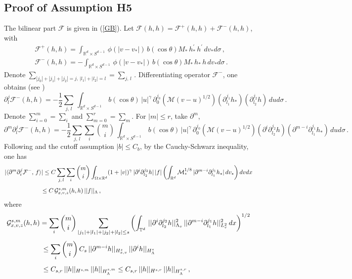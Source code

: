 \documentclass[final,onefignum,onetabnum]{siamart171218}
\begin{document}
\subsection{Proof of Assumption H5}
\label{Proof_H4}
The bilinear part $\mathcal F$ is given in (\ref{GB}). Let $\mathcal F(h,h)=\mathcal F^{+}(h,h) + \mathcal F^{-}(h,h)$, with
\begin{align*}
&\displaystyle \mathcal F^{+}(h,h)= \int_{\mathbb R^{d}\times S^{d-1}}\, \phi(|v-v_{\ast}|)\, b(\cos\theta)
M_{\ast}\, h_{\ast}^{\prime}\, h^{\prime}\, dv_{\ast}d\sigma\,,  \\[2pt]
&\displaystyle \mathcal F^{-}(h,h) = -\int_{\mathbb R^{d}\times S^{d-1}}\,  \phi(|v-v_{\ast}|)\, b(\cos\theta)
M_{\ast}\, h_{\ast}\, h\, dv_{\ast}d\sigma\,.
\end{align*}
Denote $\sum_{|j_0|+|j_1|+|j_2|=j,\, |l_1|+|l_2|=l} =\sum_{j,\, l}$\,. 
Differentiating operator $\mathcal F^{-}$, one obtains (see \cite{MB})
$$\partial_l^{j}\mathcal F^{-}(h,h)=-\frac{1}{2}\sum_{j,\, l}\, \int_{\mathbb R^{d}\times S^{d-1}}\,
b(\cos\theta)\, |u|^{\gamma}\, \partial_{0}^{j_0}\left(\mathcal M(v-u)^{1/2}\right)(\partial_{l_1}^{j_1}h_{\ast})(\partial_{l_2}^{j_2}h)\, dud\sigma\,.$$
Denote $\sum_{i=0}^{m}=\sum_{i}$ and $\sum_{m=0}^{r}=\sum_{m}$.
For $|m|\leq r$, take $\partial^m$,
$$ \partial^m \partial_l^{j}\mathcal F^{-}(h,h) = -\frac{1}{2}\sum_{j,\, l}\sum_{i}\binom{m}{i}\,
\int_{\mathbb R^{d}\times S^{d-1}}\, b(\cos\theta)\, |u|^{\gamma}\, \partial_{0}^{j_0}\left(\mathcal M(v-u)^{1/2}\right)
(\partial^{i}\partial_{l_2}^{j_2}h)(\partial^{m-i}\partial_{l_1}^{j_1}h_{\ast})\, dud\sigma\,. $$
Following \cite{MB} and the cutoff assumption $|b|\leq C_b$, by the Cauchy-Schwarz inequality, one has
\begin{align}
&\displaystyle |\langle\partial^{m}\partial_i^{j}\mathcal F^{-}, \, f\rangle| \leq C \sum_{j,\, l} \sum_{i}\binom{m}{i}
\int_{\Omega\times\mathbb R^{d}} (1+|v|)^{\gamma}\, |\partial^{i}\partial_{l_2}^{j_2}h|\, |f| \left(\int_{\mathbb R^{d}}\mathcal
M_{\ast}^{1/8}\, |\partial^{m-i}\partial_{l_1}^{j_1}h_{\ast}|\, dv_{\ast}\right) dvdx \notag\\[4pt]
&\label{G0}\displaystyle \qquad\qquad\qquad\leq C\, \mathcal G^{s,m}_{x,v,z}(h,h)\, ||f||_{\Lambda}\,,
\end{align}
where
\begin{align}
&\displaystyle\mathcal G^{s,m}_{x,v,z}(h,h) = \sum_{i}\binom{m}{i} \sum_{|j_1|+|l_1|+|j_2|+|l_2|\leq s}\left(\int_{\mathbb T^{d}}\, ||\partial^{i}\partial_{l_2}^{j_2}h||_{\Lambda_v}^2\, ||\partial^{m-i}\partial_{l_1}^{j_1}h||_{L^2_v}^2\, dx\right)^{1/2} \notag\\[4pt]
&\displaystyle\qquad\qquad\quad\leq \sum_{i}\binom{m}{i}\,
C_s\, ||\partial^{m-i}h||_{H_{x,v}^s}\, ||\partial^i h||_{H_{\Lambda}^s}
\notag \\[4pt]
&\label{G1}\displaystyle\qquad\qquad\quad\leq C_{s,r}\, ||h||_{H^{s,m}}\, ||h||_{H_{\Lambda}^{s,m}}
\leq C_{s,r}\, ||h||_{H^{s,r}}\, ||h||_{H_{\Lambda}^{s,r}}\,,
\end{align}
\end{document}
